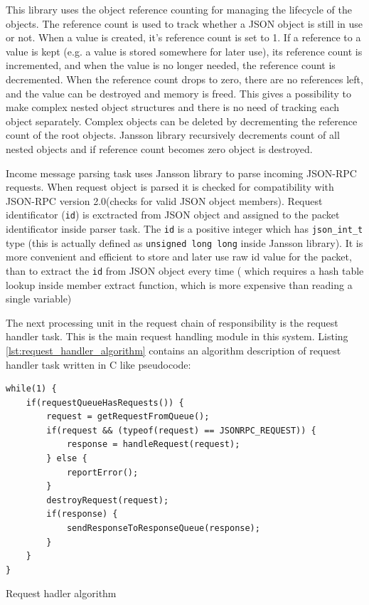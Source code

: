 This library uses the object reference counting for managing the lifecycle of the objects.
The reference count is used to track whether a JSON object is still in use or not. 
When a value is created, it’s reference count is set to 1. 
If a reference to a value is kept (e.g. a value is stored somewhere for later use), its reference count is incremented, and when the value is no longer needed, the reference count is decremented. 
When the reference count drops to zero, there are no references left, and the value can be destroyed and memory is freed.
This gives a possibility to make complex nested object structures and there is no need of tracking each object separately.
Complex objects can be deleted by decrementing the reference count of the root objects. 
Jansson library recursively decrements count of all nested objects and if reference count becomes zero object is destroyed.

Income message parsing task uses Jansson library to parse incoming JSON-RPC requests.
When request object is parsed it is checked for compatibility with JSON-RPC version 2.0(checks for valid JSON object members). 
Request identificator (\texttt{id}) is exctracted from JSON object and assigned to the packet identificator inside parser task.
The \texttt{id} is a positive integer which has \texttt{json\_int\_t} type (this is actually defined as \texttt{unsigned long long} inside Jansson library).
It is more convenient and efficient to store and later use raw id value for the packet, than to extract the \texttt{id} from JSON object every time
( which requires a hash table lookup inside member extract function, which is more expensive than reading a single variable)


The next processing unit in the request chain of responsibility is the request handler task.
This is the main request handling module in this system.
Listing \ref{lst:request_handler_algorithm} contains an algorithm description of request handler task written in C like pseudocode: 

\begin{listing}[H]
\begin{verbatim}
while(1) {
	if(requestQueueHasRequests()) {
		request = getRequestFromQueue();
		if(request && (typeof(request) == JSONRPC_REQUEST)) {
			response = handleRequest(request);			
		} else {
			reportError();
		}
		destroyRequest(request);
		if(response) {
			sendResponseToResponseQueue(response);
		}		
	}
}
\end{verbatim}
\caption{Request hadler algorithm}
\label{lst:request_handler_algorithm}
\end{listing}


